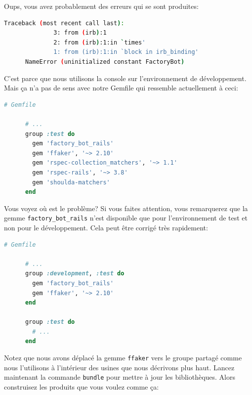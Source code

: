 \documentclass[]{report}
\begin{document}
    Oups, vous avez probablement des erreurs qui se sont produites:

    \begin{scriptsize}
      \begin{lstlisting}[language=bash]
      Traceback (most recent call last):
              3: from (irb):1
              2: from (irb):1:in `times'
              1: from (irb):1:in `block in irb_binding'
      NameError (uninitialized constant FactoryBot)
      \end{lstlisting}
    \end{scriptsize}

    C'est parce que nous utilisons la console sur l'environnement de développement. Mais ça n'a pas de sens avec notre Gemfile qui ressemble actuellement à ceci:

    \begin{scriptsize}
      \begin{lstlisting}[language=ruby]
      # Gemfile

      # ...
      group :test do
        gem 'factory_bot_rails'
        gem 'ffaker', '~> 2.10'
        gem 'rspec-collection_matchers', '~> 1.1'
        gem 'rspec-rails', '~> 3.8'
        gem 'shoulda-matchers'
      end
      \end{lstlisting}
    \end{scriptsize}

    Vous voyez où est le problème? Si vous faites attention, vous remarquerez que la gemme \verb|factory_bot_rails| n'est disponible que pour l'environnement de test et non pour le développement. Cela peut être corrigé très rapidement:

    \begin{scriptsize}
      \begin{lstlisting}[language=ruby]
      # Gemfile

      # ...
      group :development, :test do
        gem 'factory_bot_rails'
        gem 'ffaker', '~> 2.10'
      end

      group :test do
        # ...
      end
      \end{lstlisting}
    \end{scriptsize}

    Notez que nous avons déplacé la gemme \verb|ffaker| vers le groupe partagé comme nous l'utilisons à l'intérieur des usines que nous décrivons plus haut. Lancez maintenant la commande \verb|bundle| pour mettre à jour les bibliothèques. Alors construisez les produits que vous voulez comme ça:
\end{document}
